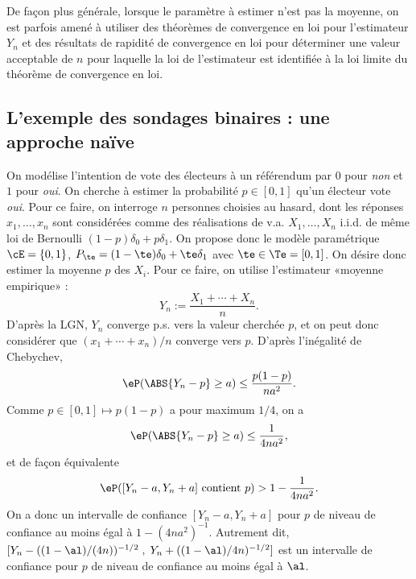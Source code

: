 De façon plus générale, lorsque le paramètre à estimer n'est pas la moyenne,
on est parfois amené à utiliser des théorèmes de convergence en loi pour
l'estimateur $Y_n$ et des résultats de rapidité de convergence en loi pour
déterminer une valeur acceptable de $n$ pour laquelle la loi de l'estimateur
est identifiée à la loi limite du théorème de convergence en loi.

\subsection{L'exemple des sondages binaires : une approche naïve}

On modélise l'intention de vote des électeurs à un référendum par $0$ pour
\emph{non} et $1$ pour \emph{oui}. On cherche à estimer la probabilité
$p\in[0,1]$ qu'un électeur vote \emph{oui}. Pour ce faire, on interroge $n$
personnes choisies au hasard, dont les réponses $x_1,\ldots,x_n$ sont
considérées comme des réalisations de v.a. $X_1,\ldots,X_n$ i.i.d. de même loi
de Bernoulli $(1-p)\delta_0+p\delta_1$. On propose donc le modèle paramétrique
$\cE=\{0,1\}$, $P_\te=(1-\te)\delta_0+\te\delta_1$ avec $\te\in\Te=[0,1]$. On désire
donc estimer la moyenne $p$ des $X_i$. Pour ce faire, on utilise l'estimateur
«moyenne empirique» :
$$
Y_n:=\frac{X_1+\cdots+X_n}{n}.
$$
D'après la LGN, $Y_n$ converge p.s. vers la valeur cherchée $p$, et on peut
donc considérer que $(x_1+\cdots+x_n)/n$ converge vers $p$.  D'après
l'inégalité de Chebychev,
$$
\eP(\ABS{Y_n-p} \geq a) \leq \frac{p(1-p)}{na^2}.
$$
Comme $p\in[0,1]\mapsto p(1-p)$ a pour maximum
$1/4$, on a
$$
\eP(\ABS{Y_n-p} \geq a) \leq \frac{1}{4na^2},
$$
et de façon équivalente
$$
\eP([Y_n-a,Y_n+a] \text{ contient } p) > 1-\frac{1}{4na^2}.
$$
On a donc un intervalle de confiance $[Y_n-a,Y_n+a]$ pour $p$ de niveau de
confiance au moins égal à $1-(4na^2)^{-1}$. Autrement dit,
$[Y_n-((1-\al)/(4n))^{-1/2}\;,\;Y_n+((1-\al)/4n)^{-1/2}]$ est un intervalle de
confiance pour $p$ de niveau de confiance au moins égal à $\al$.


